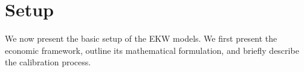 \section{Setup}
We now present the basic setup of the EKW models. We first present the economic framework, outline its mathematical formulation, and briefly describe the calibration process.






